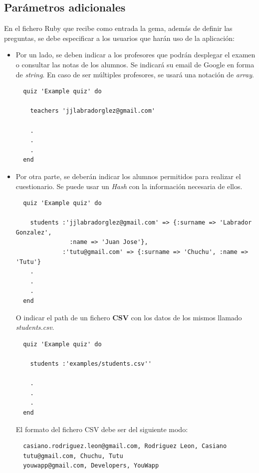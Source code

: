 \subsection{Par\'ametros adicionales}
\label{subsec:Apendice2.12}

En el fichero Ruby que recibe como entrada la gema, adem\'as de definir las preguntas, se debe especificar a los usuarios que har\'an
uso de la aplicaci\'on:

\begin{itemize}
  \item Por un lado, se deben indicar a los profesores que podr\'an desplegar el examen o consultar las notas de los alumnos. Se indicar\'a
  su email de Google en forma de \textit{string}. En caso de ser m\'ultiples profesores, se usar\'a una notaci\'on de \textit{array}. 
  \begin{verbatim}
  quiz 'Example quiz' do
    
    teachers 'jjlabradorglez@gmail.com'
    
    .
    .
    .
  end
  \end{verbatim}
  
  \item Por otra parte, se deber\'an indicar los alumnos permitidos para realizar el cuestionario. Se puede usar un \textit{Hash} con 
  la informaci\'on necesaria de ellos. 
  \begin{verbatim}
  quiz 'Example quiz' do
    
    students :'jjlabradorglez@gmail.com' => {:surname => 'Labrador Gonzalez', 
               :name => 'Juan Jose'}, 
             :'tutu@gmail.com' => {:surname => 'Chuchu', :name => 'Tutu'}
    .
    .
    .
  end
  \end{verbatim}
  
  O indicar el path de un fichero {\bfseries CSV} con los datos de los mismos llamado \textit{students.csv}.
  \begin{verbatim}
  quiz 'Example quiz' do
    
    students :'examples/students.csv''
    
    .
    .
    .
  end
  \end{verbatim}
  
  El formato del fichero CSV debe ser del siguiente modo:
  \begin{verbatim}
  casiano.rodriguez.leon@gmail.com, Rodriguez Leon, Casiano
  tutu@gmail.com, Chuchu, Tutu
  youwapp@gmail.com, Developers, YouWapp
  \end{verbatim}
  
\end{itemize}

